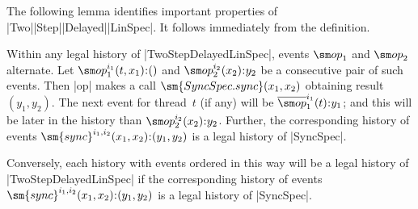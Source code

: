 

The following lemma identifies important properties of
|Two|\-|Step|\-|Delayed|\-|LinSpec|.  It follows immediately from the
definition.
%
\begin{lemma}
\label{lem:TwoStepLinSpec-histories}
Within any legal history of |TwoStepDelayedLinSpec|, events $\op_1$ and
$\op_2$ alternate.  Let $\op_1^{i_1}(t,x_1) \:: ()$ and $\op_2^{i_2}(x_2) \::
y_2$ be a consecutive pair of such events.  Then |op| makes a call
$\sm{SyncSpec.sync}(x_1, x_2)$ obtaining result $(y_1,y_2)$.  The next event
for thread~$t$ (if any) will be $\overline\op_1^{i_1}(t) \:: y_1$; and this
will be later in the history than $\op_2^{i_2}(x_2) \:: y_2$.  Further, the
corresponding history of events $\sm{sync}^{i_1,i_2}(x_1,x_2) \:: (y_1,y_2)$
is a legal history of |SyncSpec|.

Conversely, each history with events ordered in this way will be a legal
history of |TwoStepDelayedLinSpec| if  the corresponding history
of events $\sm{sync}^{i_1,i_2}(x_1,x_2) \:: (y_1,y_2)$ is a legal history of
|SyncSpec|.
\end{lemma}


